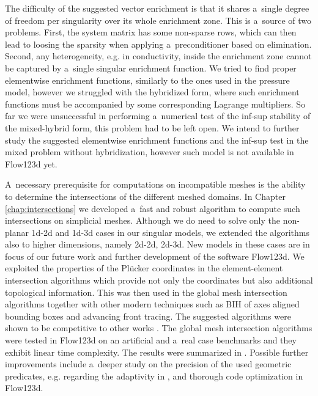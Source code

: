 \documentclass[bibliography=totocnumbered,dvipsnames,FM,Dis, EN]{tulthesis_autoreferat}
\newcommand{\plucker}{Pl\"{u}cker }
\begin{document}
The difficulty of the suggested vector enrichment is that it shares a~single degree of freedom per singularity
over its whole enrichment zone. This is a~source of two problems. First, the system matrix has some non-sparse rows,
which can then lead to loosing the sparsity when applying a~preconditioner based on elimination.
Second, any heterogeneity, e.g. in conductivity, inside the enrichment zone cannot be captured by
a~single singular enrichment function.
We tried to find proper elementwise enrichment functions, similarly to the ones used in the pressure model,
however we struggled with the hybridized form, where such enrichment functions must be accompanied
by some corresponding Lagrange multipliers.
So far we were unsuccessful in performing a~numerical test of the inf-sup stability
of the mixed-hybrid form, this problem had to be left open.
We intend to further study the suggested elementwise enrichment functions and the inf-sup test in the mixed problem without hybridization,
however such model is not available in Flow123d yet.


A~necessary prerequisite for computations on incompatible meshes is the ability to determine
the intersections of the different meshed domains. In Chapter \ref{chap:intersections} we developed
a~fast and robust algorithm to compute such intersections on simplicial meshes.
Although we do need to solve only the non-planar 1d-2d and 1d-3d cases in our singular models,
we extended the algorithms also to higher dimensions, namely 2d-2d, 2d-3d.
New models in these cases are in focus of our future work and further development of the software Flow123d.
We exploited the properties of the \plucker coordinates \cite{platis_fast_2003, joswig_plucker_2013}
in the element-element intersection algorithms which provide not only the coordinates but also additional topological information.
This was then used in the global mesh intersection algorithms together with other modern techniques
such as BIH of axes aligned bounding boxes and advancing front tracing.
The suggested algorithms were shown to be competitive to other works \cite{moller_fast_1997, haines_fast_1991}.
The global mesh intersection algorithms were tested in Flow123d on an artificial and a~real case benchmarks
and they exhibit linear time complexity. The results were summarized in \cite{brezina_2017}.
Possible further improvements include a~deeper study on the precision of the used geometric predicates,
e.g. regarding the adaptivity in \cite{shewchuk_adaptive_1997}, and thorough code optimization in Flow123d.
\end{document}
